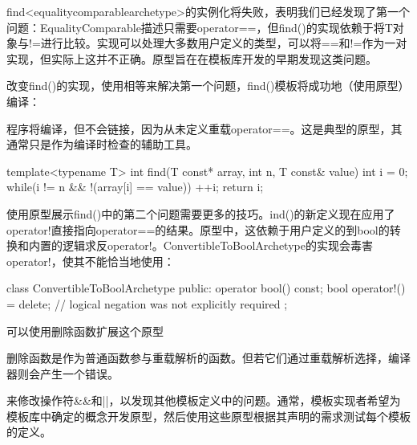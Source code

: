 find<equalitycomparablearchetype>的实例化将失败，表明我们已经发现了第一个问题：EqualityComparable描述只需要operator==，但find()的实现依赖于将T对象与!=进行比较。实现可以处理大多数用户定义的类型，可以将==和!=作为一对实现，但实际上这并不正确。原型旨在在模板库开发的早期发现这类问题。

改变find()的实现，使用相等来解决第一个问题，find()模板将成功地（使用原型）编译：

\begin{notice}
程序将编译，但不会链接，因为从未定义重载operator==。这是典型的原型，其通常只是作为编译时检查的辅助工具。
\end{notice}

\begin{cpp}
template<typename T>
int find(T const* array, int n, T const& value) {
	int i = 0;
	while(i != n && !(array[i] == value))
		++i;
	return i;
}
\end{cpp}

使用原型展示find()中的第二个问题需要更多的技巧。ind()的新定义现在应用了operator!直接指向operator==的结果。原型中，这依赖于用户定义的到bool的转换和内置的逻辑求反operator!。ConvertibleToBoolArchetype的实现会毒害operator!，使其不能恰当地使用：

\begin{cpp}
class ConvertibleToBoolArchetype {
	public:
	operator bool() const;
	bool operator!() = delete; // logical negation was not explicitly required
};
\end{cpp}

可以使用删除函数扩展这个原型

\begin{notice}
删除函数是作为普通函数参与重载解析的函数。但若它们通过重载解析选择，编译器则会产生一个错误。
\end{notice}

来修改操作符\&\&和||，以发现其他模板定义中的问题。通常，模板实现者希望为模板库中确定的概念开发原型，然后使用这些原型根据其声明的需求测试每个模板的定义。






















